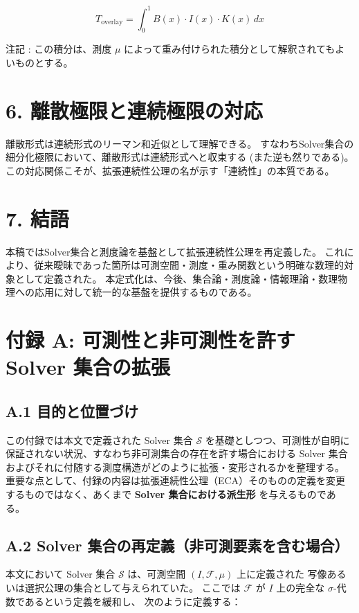 \documentclass[12pt,a4paper]{article}
\begin{document}
\[
T_{\mathrm{overlay}} = \int_0^1 B(x) \cdot I(x) \cdot K(x) \, dx
\]

注記 : この積分は、測度 $\mu$ によって重み付けられた積分として解釈されてもよいものとする。

\section{6. 離散極限と連続極限の対応}
離散形式は連続形式のリーマン和近似として理解できる。
すなわちSolver集合の細分化極限において、離散形式は連続形式へと収束する (また逆も然りである)。
この対応関係こそが、拡張連続性公理の名が示す「連続性」の本質である。

\section{7. 結語}
本稿ではSolver集合と測度論を基盤として拡張連続性公理を再定義した。
これにより、従来曖昧であった箇所は可測空間・測度・重み関数という明確な数理的対象として定義された。
本定式化は、今後、集合論・測度論・情報理論・数理物理への応用に対して統一的な基盤を提供するものである。






\section{付録 A: 可測性と非可測性を許す Solver 集合の拡張}

\subsection{A.1 目的と位置づけ} 
この付録では本文で定義された Solver 集合 $\mathcal{S}$ を基礎としつつ、可測性が自明に保証されない状況、すなわち非可測集合の存在を許す場合における Solver 集合およびそれに付随する測度構造がどのように拡張・変形されるかを整理する。
重要な点として、付録の内容は拡張連続性公理（ECA）そのものの定義を変更するものではなく、あくまで \textbf{Solver 集合における派生形} を与えるものである。

\subsection{A.2 Solver 集合の再定義（非可測要素を含む場合）} 
本文において Solver 集合 $\mathcal{S}$ は、可測空間 $(I, \mathcal{F}, \mu)$ 上に定義された 写像あるいは選択公理の集合として与えられていた。
ここでは $\mathcal{F}$ が $I$ 上の完全な $\sigma$-代数であるという定義を緩和し、 次のように定義する： 
\end{document}
